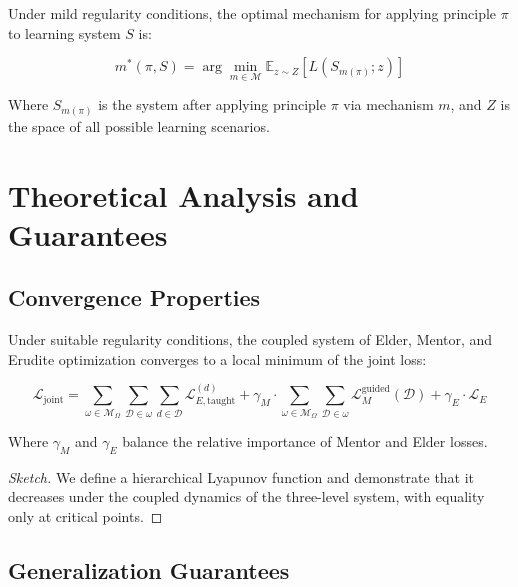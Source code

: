 \begin{theorem}
Under mild regularity conditions, the optimal mechanism for applying principle $\pi$ to learning system $S$ is:

\begin{equation}
m^*(\pi, S) = \arg\min_{m \in \mathcal{M}} \mathbb{E}_{z \sim Z}[L(S_{m(\pi)}; z)]
\end{equation}

Where $S_{m(\pi)}$ is the system after applying principle $\pi$ via mechanism $m$, and $Z$ is the space of all possible learning scenarios.
\end{theorem}

\section{Theoretical Analysis and Guarantees}

\subsection{Convergence Properties}

\begin{theorem}
Under suitable regularity conditions, the coupled system of Elder, Mentor, and Erudite optimization converges to a local minimum of the joint loss:

\begin{equation}
\mathcal{L}_{\text{joint}} = \sum_{\omega \in \mathcal{M}_{\Omega}} \sum_{\mathcal{D} \in \omega} \sum_{d \in \mathcal{D}} \mathcal{L}_{E,\text{taught}}^{(d)} + \gamma_M \cdot \sum_{\omega \in \mathcal{M}_{\Omega}} \sum_{\mathcal{D} \in \omega} \mathcal{L}_{M}^{\text{guided}}(\mathcal{D}) + \gamma_E \cdot \mathcal{L}_E
\end{equation}

Where $\gamma_M$ and $\gamma_E$ balance the relative importance of Mentor and Elder losses.
\end{theorem}

\begin{proof}[Sketch]
We define a hierarchical Lyapunov function and demonstrate that it decreases under the coupled dynamics of the three-level system, with equality only at critical points.
\end{proof}

\subsection{Generalization Guarantees}

